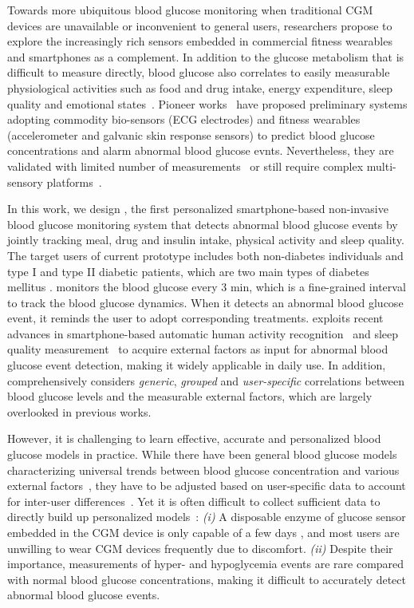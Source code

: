 Towards more ubiquitous blood glucose monitoring when traditional CGM devices are unavailable or inconvenient to general users, researchers propose to explore the increasingly rich sensors embedded in commercial fitness wearables and smartphones as a complement.
In addition to the glucose metabolism that is difficult to measure directly, blood glucose also correlates to easily measurable physiological activities such as food and drug intake, energy expenditure, sleep quality and emotional states~\cite{bib:DRCP15:Iwasaki}.
Pioneer works~\cite{bib:EMBC12:Nguyen, bib:SEMPER16:Ranvier, bib:JDST14:Sobel} have proposed preliminary systems adopting commodity bio-sensors (\eg ECG electrodes) and fitness wearables (\eg accelerometer and galvanic skin response sensors) to predict blood glucose concentrations and alarm abnormal blood glucose evnts.
Nevertheless, they are validated with limited number of measurements~\cite{bib:SEMPER16:Ranvier, bib:JDST14:Sobel} or still require complex multi-sensory platforms~\cite{bib:EMBC12:Nguyen, bib:JDST14:Sobel}.

In this work, we design \sysname, the first personalized smartphone-based non-invasive blood glucose monitoring system that detects abnormal blood glucose events by jointly tracking meal, drug and insulin intake, physical activity and sleep quality. \textcolor[rgb]{1.00,0.00,0.00}{The target users of current prototype includes both non-diabetes individuals and type I and type II diabetic patients, which are two main types of diabetes mellitus \cite{bib:Diabetes_mellitus}. \sysname monitors the blood glucose every 3 min, which is a fine-grained interval to track the blood glucose dynamics. When it detects an abnormal blood glucose event, it reminds the user to adopt corresponding treatments}.
\sysname exploits recent advances in smartphone-based automatic human activity recognition~\cite{bib:KDDEN11:Kwapisz} and sleep quality measurement~\cite{bib:UbiComp14:Gu} to acquire external factors as input for abnormal blood glucose event detection, making it widely applicable in daily use.
In addition, \sysname comprehensively considers \emph{generic}, \emph{grouped}  and \emph{user-specific} correlations between blood glucose levels and the measurable external factors, which are largely overlooked in previous works.

However, it is challenging to learn effective, accurate and personalized blood glucose models in practice.
While there have been general blood glucose models characterizing universal trends between blood glucose concentration and various external factors~\cite{bib:IJNMBE16:Oviedo}, they have to be adjusted based on user-specific data to account for inter-user differences~\cite{bib:ICMLA13:Bunescu}.
Yet it is often difficult to collect sufficient data to directly build up personalized models~\cite{bib:KDHealth16:Marling}:
\emph{(i)}
A disposable enzyme of glucose sensor embedded in the CGM device is only capable of a few days \cite{bib:CGM_wiki, bib:CGM_wave}, and most users are unwilling to wear CGM devices frequently due to discomfort.
\emph{(ii)}
Despite their importance, measurements of hyper- and hypoglycemia events are rare compared with normal blood glucose concentrations, making it difficult to accurately detect abnormal blood glucose events.

